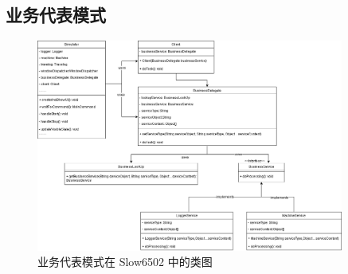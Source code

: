 \subsection{业务代表模式}

\begin{figure}[htb]
  \centering
  \includegraphics[width=0.9\textwidth]{figures/业务代表模式.png}
  \caption{业务代表模式在 Slow6502 中的类图}
\end{figure}
